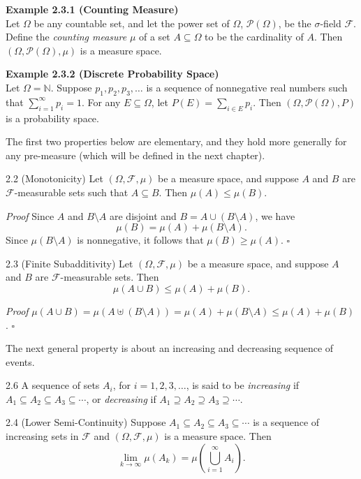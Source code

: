 \textbf{Example 2.3.1 (Counting Measure)} \\
Let $\Omega$ be any countable set, and let the power set of $\Omega$, $\mathcal{P}(\Omega)$, be the $\sigma$-field $\mathcal{F}$. Define the \textit{counting measure} $\mu$ of a set $A\subseteq \Omega$ to be the cardinality of $A$. Then $(\Omega,\mathcal{P}(\Omega),\mu)$ is a measure space.

\textbf{Example 2.3.2 (Discrete Probability Space)} \\
Let $\Omega=\mathbb{N}$. Suppose $p_1,p_2,p_3,\dots$ is a sequence of nonnegative real numbers such that $\sum_{i=1}^{\infty} p_i=1$. For any $E\subseteq \Omega$, let $P(E)=\sum_{i\in E} p_i$. Then $(\Omega,\mathcal{P}(\Omega),P)$ is a probability space.

The first two properties below are elementary, and they hold more generally for any pre-measure (which will be defined in the next chapter).

\begin{thmbox}{2.2 (Monotonicity)}
Let $(\Omega,\mathcal{F},\mu)$ be a measure space, and suppose $A$ and $B$ are $\mathcal{F}$-measurable sets such that $A\subseteq B$. Then $\mu(A)\le \mu(B)$.
\end{thmbox}

\textit{Proof} Since $A$ and $B\setminus A$ are disjoint and $B=A\cup (B\setminus A)$, we have
\[
\mu(B)=\mu(A)+\mu(B\setminus A).
\]
Since $\mu(B\setminus A)$ is nonnegative, it follows that $\mu(B)\ge \mu(A)$. \hfill $\square$

\begin{thmbox}{2.3 (Finite Subadditivity)}
Let $(\Omega,\mathcal{F},\mu)$ be a measure space, and suppose $A$ and $B$ are $\mathcal{F}$-measurable sets. Then
\[
\mu(A\cup B)\le \mu(A)+\mu(B).
\]
\end{thmbox}

\textit{Proof} $\mu(A\cup B)=\mu(A \uplus (B\setminus A))=\mu(A)+\mu(B\setminus A)\le \mu(A)+\mu(B)$. \hfill $\square$

The next general property is about an increasing and decreasing sequence of events.

\begin{defbox}{2.6}
A sequence of sets $A_i$, for $i=1,2,3,\dots$, is said to be \textit{increasing} if $A_1\subseteq A_2\subseteq A_3\subseteq \cdots$, or \textit{decreasing} if $A_1\supseteq A_2\supseteq A_3\supseteq \cdots$.
\end{defbox}

\begin{thmbox}{2.4 (Lower Semi-Continuity)}
Suppose $A_1\subseteq A_2\subseteq A_3\subseteq \cdots$ is a sequence of increasing sets in $\mathcal{F}$ and $(\Omega,\mathcal{F},\mu)$ is a measure space. Then
\[
\lim_{k\to\infty} \mu(A_k)=\mu\left(\bigcup_{i=1}^{\infty} A_i\right).
\]
\end{thmbox}


